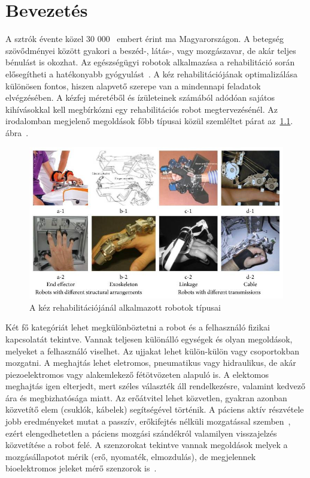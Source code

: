 \chapter{Bevezetés}

A sztrók évente közel 30 000~\cite{Bereczki2023} embert érint ma Magyarországon. A betegség szövődményei között gyakori 
a beszéd-, látás-, vagy mozgászavar, de akár teljes bénulást is okozhat. Az egészségügyi robotok alkalmazása a 
rehabilitáció során elősegítheti a hatékonyabb gyógyulást~\cite{Chang2013}. A kéz rehabilitációjának optimalizálása 
különösen fontos, hiszen alapvető szerepe van a mindennapi feladatok elvégzésében. A kézfej méretéből és ízületeinek számából 
adódóan sajátos kihívásokkal kell megbírkózni egy rehabilitációs robot megtervezésénél.
Az irodalomban megjelenő megoldások főbb típusai közül szemléltet párat az~\ref{fig:hand_rehab_robot_types}. ábra~\cite{Yue2017}.
\begin{figure}[ht]
    \begin{center}
    \includegraphics[width=12cm]{images/hand_rehab_robot_types.jpeg}
    \caption{A kéz rehabilitációjánál alkalmazott robotok típusai}\label{fig:hand_rehab_robot_types}
    \end{center}
\end{figure}
Két fő kategóriát lehet megkülönböztetni a robot és a felhasználó fizikai kapcsolatát tekintve. Vannak teljesen 
különálló egységek és olyan megoldások, melyeket a felhasználó viselhet. Az ujjakat lehet külön-külön vagy 
csoportokban mozgatni. A meghajtás lehet eletromos, pneumatikus vagy hidraulikus, de akár piezoelektromos vagy 
alakemlekező fétötvözeten alapuló is. A elektomos meghajtás igen elterjedt, mert széles választék áll rendelkezésre, 
valamint kedvező ára és megbizhatósága miatt. Az erőátvitel lehet közvetlen, gyakran azonban közvetítő elem (csuklók, kábelek) 
segítségével történik. A páciens aktív részvétele jobb eredményeket mutat a passzív, erőkifejtés nélküli mozgatással 
szemben~\cite{Remsik2016}, ezért elengedhetetlen a páciens mozgási szándékról valamilyen visszajelzés közvetítése a robot felé.
A szenzorokat tekintve vannak megoldások melyek a mozgásállapotot mérik (erő, nyomaték, elmozdulás), de megjelennek 
bioelektromos jeleket mérő szenzorok is~\cite{Satakogiou}. 

